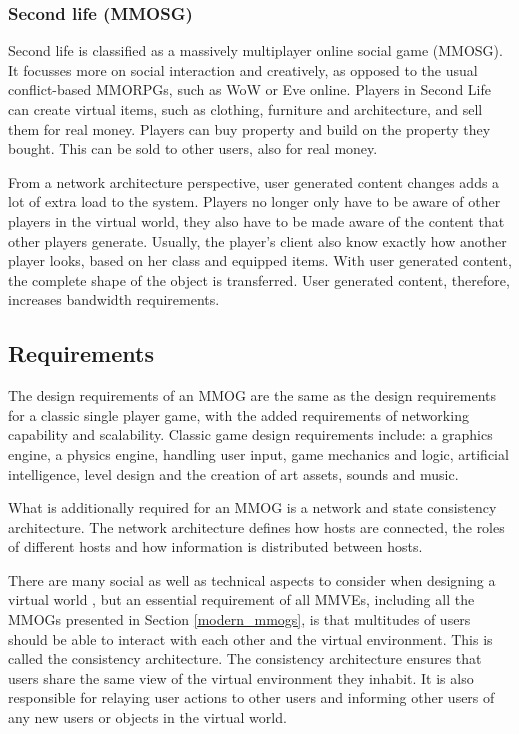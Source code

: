 \subsubsection{Second life (MMOSG)}

Second life is classified as a massively multiplayer online social game (MMOSG). It focusses more on social interaction and creatively, as opposed to the usual conflict-based MMORPGs, such as WoW or Eve online. Players in Second Life can create virtual items, such as clothing, furniture and architecture, and sell them for real money. Players can buy property and build on the property they bought. This can be sold to other users, also for real money.

From a network architecture perspective, user generated content changes adds a lot of extra load to the system. Players no longer only have to be aware of other players in the virtual world, they also have to be made aware of the content that other players generate. Usually, the player's client also know exactly how another player looks, based on her class and equipped items. With user generated content, the complete shape of the object is transferred. User generated content, therefore, increases bandwidth requirements.

\subsection{Requirements}
\label{mmve_requirements}

The design requirements of an MMOG are the same as the design requirements for a classic single player game, with the added requirements of networking capability and scalability. Classic game design requirements include: a graphics engine, a physics engine, handling user input, game mechanics and logic, artificial intelligence, level design and the creation of art assets, sounds and music.

What is additionally required for an MMOG is a network and state consistency architecture. The network architecture defines how hosts are connected, the roles of different hosts and how information is distributed between hosts.

There are many social as well as technical aspects to consider when designing a virtual world \cite{designing_virtual_worlds}, but an essential requirement of all MMVEs, including all the MMOGs presented in Section \ref{modern_mmogs}, is that multitudes of users should be able to interact with each other and the virtual environment. This is called the consistency architecture. The consistency architecture ensures that users share the same view of the virtual environment they inhabit. It is also responsible for relaying user actions to other users and informing other users of any new users or objects in the virtual world.


